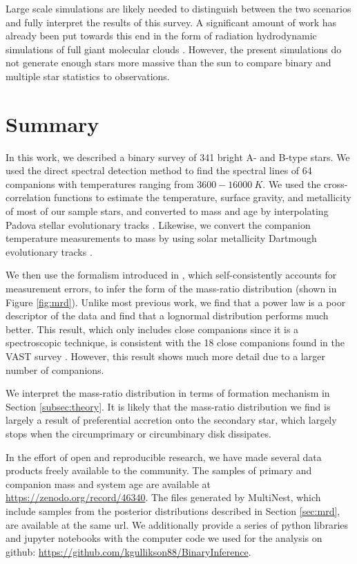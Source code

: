 \documentclass{emulateapj}
\begin{document}
Large scale simulations are likely needed to distinguish between the two scenarios and fully interpret the results of this survey. A significant amount of work has already been put towards this end in the form of radiation hydrodynamic simulations of full giant molecular clouds \citep{Bate2012, Krumholz2012}. However, the present simulations do not generate enough stars more massive than the sun to compare binary and multiple star statistics to observations. 


\section{Summary}

In this work, we described a binary survey of 341 bright A- and B-type stars. We used the direct spectral detection method \citep{Gullikson2016} to find the spectral lines of 64 companions with temperatures ranging from $3600 - 16000\ K$.  We used the cross-correlation functions to estimate the temperature, surface gravity, and metallicity of most of our sample stars, and converted to mass and age by interpolating Padova stellar evolutionary tracks \citep{Bressan2012}. Likewise, we convert the companion temperature measurements to mass by using solar metallicity Dartmough evolutionary tracks \citep{Dotter2008}. 

We then use the formalism introduced in \citet{Foreman2014}, which self-consistently accounts for measurement errors, to infer the form of the mass-ratio distribution (shown in Figure \ref{fig:mrd}). Unlike most previous work, we find that a power law is a poor descriptor of the data and find that a lognormal distribution performs much better. This result, which only includes close companions since it is a spectroscopic technique, is consistent with the 18 close companions found in the VAST survey \cite{DeRosa2014}. However, this result shows much more detail due to a larger number of companions. 

We interpret the mass-ratio distribution in terms of formation mechanism in Section \ref{subsec:theory}. It is likely that the mass-ratio distribution we find is largely a result of preferential accretion onto the secondary star, which largely stops when the circumprimary or circumbinary disk dissipates.

In the effort of open and reproducible research, we have made several data products freely available to the community. The samples of primary and companion mass and system age are available at \url{https://zenodo.org/record/46340}. The files generated by MultiNest, which include samples from the posterior distributions described in Section \ref{sec:mrd}, are available at the same url. We additionally provide a series of python libraries and jupyter notebooks with the computer code we used for the analysis on github: \url{https://github.com/kgullikson88/BinaryInference}.
\end{document}
